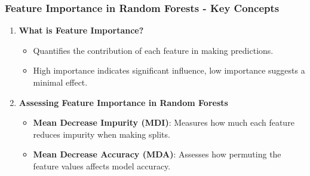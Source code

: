 \documentclass[aspectratio=169]{beamer}
\begin{document}
\begin{frame}[fragile]
    \frametitle{Feature Importance in Random Forests - Key Concepts}
    \begin{enumerate}
        \item \textbf{What is Feature Importance?}
            \begin{itemize}
                \item Quantifies the contribution of each feature in making predictions.
                \item High importance indicates significant influence, low importance suggests a minimal effect.
            \end{itemize}
        
        \item \textbf{Assessing Feature Importance in Random Forests}
            \begin{itemize}
                \item \textbf{Mean Decrease Impurity (MDI)}: Measures how much each feature reduces impurity when making splits.
                \item \textbf{Mean Decrease Accuracy (MDA)}: Assesses how permuting the feature values affects model accuracy.
            \end{itemize}
    \end{enumerate}
\end{frame}
\end{document}

